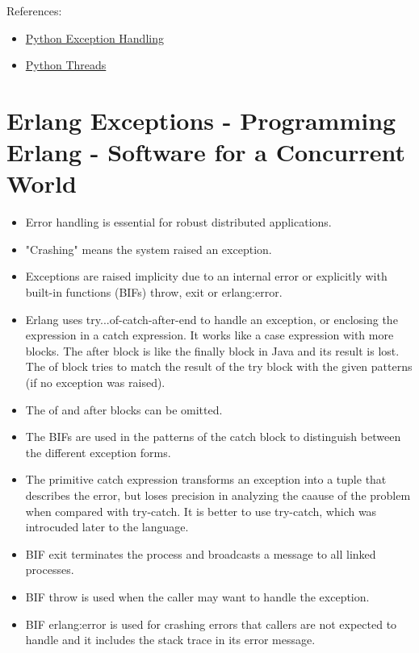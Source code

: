 \documentclass[a4paper,11pt]{article}
\theoremstyle{plain}
\theoremstyle{nonumberplain}
\begin{document}
References:

\begin{itemize}
  \item \href{https://www.honeybadger.io/blog/a-guide-to-exception-handling-in-python/}{Python Exception Handling}
  \item \href{https://dev.to/imsushant12/multithreading-in-python-lifecycle-locks-and-thread-pools-3pg3}{Python Threads}
\end{itemize}

\section{Erlang Exceptions - Programming Erlang - Software for a Concurrent World}

\begin{itemize}
  \item Error handling is essential for robust distributed applications.
  \item "Crashing" means the system raised an exception.
  \item Exceptions are raised implicity due to an internal error or explicitly with built-in functions (BIFs) throw, exit or erlang:error.
  \item Erlang uses try...of-catch-after-end to handle an exception, or enclosing the expression in a catch expression. It works like a case expression with more blocks. The after block is like the finally block in Java and its result is lost. The of block tries to match the result of the try block with the given patterns (if no exception was raised).
  \item The of and after blocks can be omitted.
  \item The BIFs are used in the patterns of the catch block to distinguish between the different exception forms.
  \item The primitive catch expression transforms an exception into a tuple that describes the error, but loses precision in analyzing the caause of the problem when compared with try-catch. It is better to use try-catch, which was introcuded later to the language.
  \item BIF exit terminates the process and broadcasts a message to all linked processes.
  \item BIF throw is used when the caller may want to handle the exception.
  \item BIF erlang:error is used for crashing errors that callers are not expected to handle and it includes the stack trace in its error message.

\end{itemize}
\end{document}
